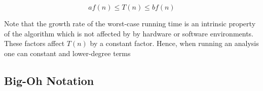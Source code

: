	$$af(n) \leq T(n) \leq bf(n)$$

	\par{Note that the growth rate of the worst-case running time is an
			intrinsic property of the algorithm which is not affected by by
	hardware or software environments. These factors affect $T(n)$ by a constant
	factor. Hence, when running an analysis one can  constant
	and lower-degree terms}




\subsection{Big-Oh Notation}



	

